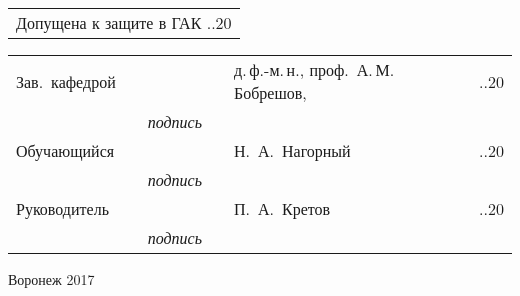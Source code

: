 \begin{titlepage}
\begin{tabularx}{\textwidth}{l}
Допущена к защите в ГАК \hspace{10mm} \underline{\hspace{5mm}}.\underline{\hspace{5mm}}.20\underline{\hspace{5mm}}\\
\end{tabularx}
\hfill \break
\vspace{5mm}
\begin{tabularx}{\textwidth}{llcllll}
Зав.~кафедрой & \hspace{2mm} & \underline{\hspace{15mm}} & \hspace{2mm} & д.\,ф.-м.\,н., проф.~А.\,М.\,Бобрешов,
& \hspace{2mm} & \underline{\hspace{5mm}}.\underline{\hspace{5mm}}.20\underline{\hspace{5mm}} \\
&& {\footnotesize \textit{подпись}} &&&& \\
Обучающийся & \hspace{2mm} & \underline{\hspace{15mm}} & \hspace{2mm} & Н.~А.~Нагорный & \hspace{2mm} & \underline{\hspace{5mm}}.\underline{\hspace{5mm}}.20\underline{\hspace{5mm}} \\
&& {\footnotesize \textit{подпись}} &&&& \\
Руководитель & \hspace{2mm} & \underline{\hspace{15mm}} & \hspace{2mm} & П.~А.~Кретов & \hspace{2mm} & \underline{\hspace{5mm}}.\underline{\hspace{5mm}}.20\underline{\hspace{5mm}} \\
&& {\footnotesize \textit{подпись}} &&&& \\

\end{tabularx}

\vspace*{\fill}

Воронеж 2017
\endgroup
\end{titlepage}

\setcounter{page}{2}